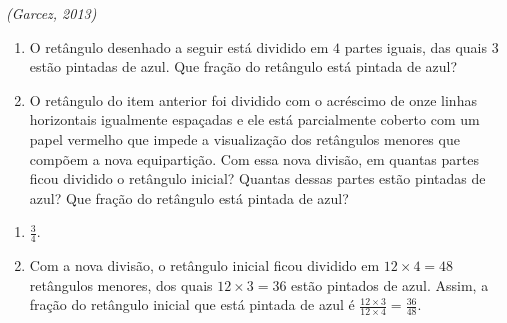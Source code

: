 \documentclass[10 pt,usenames,dvipsnames, oneside]{article}
\begin{document}
\textit{(Garcez, 2013)}

\begin{enumerate} %
  \item     O retângulo desenhado a seguir está dividido em     $4$ partes iguais, das quais     $3$ estão pintadas de azul. Que fração do retângulo está pintada de azul?
  \begin{center}
\end{center}

\item     O retângulo do item anterior foi dividido com o acréscimo de onze linhas horizontais igualmente espaçadas e ele está parcialmente coberto com um papel vermelho que impede a visualização dos retângulos menores que compõem a nova equipartição. Com essa nova divisão, em quantas partes ficou dividido o retângulo inicial? Quantas dessas partes estão pintadas de azul? Que fração do retângulo está pintada de azul?     \mbox{} \newline
\end{enumerate} %

\begin{center}
\end{center}

\ifdefined\prof
\begin{solucao}

\begin{enumerate}
\item             $\frac{3}{4}$.
\item       Com a nova divisão, o retângulo inicial ficou dividido em       $12
\times 4 = 48$ retângulos menores, dos quais       $12 \times 3 = 36$       estão
pintados de azul. Assim, a fração do retângulo inicial que está pintada de azul é
$\frac{12 \times 3}{12 \times 4} = \frac{36}{48}$.
\end{enumerate}

\end{solucao}
\fi
\end{document}
